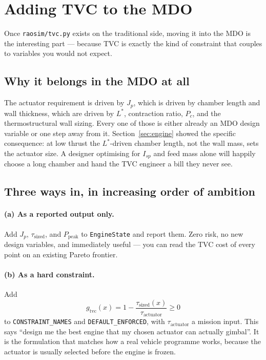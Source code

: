 \documentclass[11pt]{article}
\newcommand{\cmd}[1]{\nolinkurl{#1}}
\begin{document}
\section{Adding TVC to the MDO}
\label{sec:mdo-tvc}

Once \cmd{raosim/tvc.py} exists on the traditional side, moving it into the
MDO is the interesting part --- because TVC is exactly the kind of
constraint that couples to variables you would not expect.

\subsection{Why it belongs in the MDO at all}

The actuator requirement is driven by $J_p$, which is driven by chamber
length and wall thickness, which are driven by $L^*$, contraction ratio,
$P_c$, and the thermostructural wall sizing. Every one of those is either
already an MDO design variable or one step away from it. Section~\ref{sec:engine}
showed the specific consequence: at low thrust the $L^*$-driven chamber
length, not the wall mass, sets the actuator size. A designer optimising
for $I_{sp}$ and feed mass alone will happily choose a long chamber and hand
the TVC engineer a bill they never see.

\subsection{Three ways in, in increasing order of ambition}

\paragraph{(a) As a reported output only.} Add $J_p$, $\tau_{\text{sized}}$,
and $P_{\text{peak}}$ to \texttt{EngineState} and report them. Zero risk,
no new design variables, and immediately useful --- you can read the TVC
cost of every point on an existing Pareto frontier.

\paragraph{(b) As a hard constraint.} Add
\begin{equation}
g_{\text{tvc}}(x) = 1 - \frac{\tau_{\text{sized}}(x)}{\tau_{\text{actuator}}} \geq 0
\end{equation}
to \texttt{CONSTRAINT\_NAMES} and \texttt{DEFAULT\_ENFORCED}, with
$\tau_{\text{actuator}}$ a mission input. This says ``design me the best
engine that my chosen actuator can actually gimbal''. It is the formulation
that matches how a real vehicle programme works, because the actuator is
usually selected before the engine is frozen.
\end{document}
